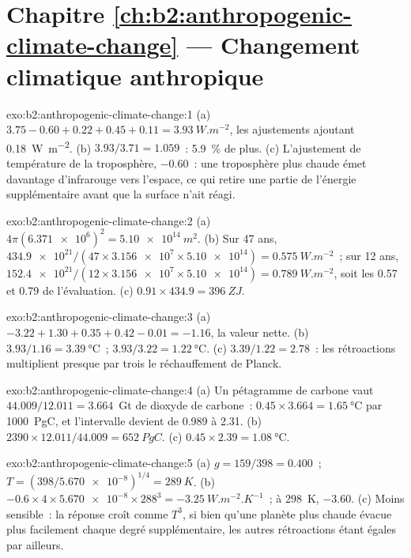\section*{Chapitre \ref{ch:b2:anthropogenic-climate-change} --- Changement climatique anthropique}

\begin{solution}{exo:b2:anthropogenic-climate-change:1}
(a) $3.75 - 0.60 + 0.22 + 0.45 + 0.11 = \qty{3.93}{W.m^{-2}}$, les ajustements ajoutant
\qty{0.18}{W.m^{-2}}. (b) $3.93/3.71 = 1.059$~: \qty{5.9}{\percent} de plus. (c) L'ajustement de
température de la troposphère, $-0.60$~: une troposphère plus chaude émet davantage d'infrarouge vers
l'espace, ce qui retire une partie de l'énergie supplémentaire avant que la surface n'ait réagi.
\end{solution}

\begin{solution}{exo:b2:anthropogenic-climate-change:2}
(a) $4\pi(\num{6.371e6})^2 = \qty{5.10e14}{m^2}$. (b) Sur 47 ans, $\num{434.9e21}/(47 \times
\num{3.156e7} \times \num{5.10e14}) = \qty{0.575}{W.m^{-2}}$~; sur 12 ans, $\num{152.4e21}/(12
\times \num{3.156e7} \times \num{5.10e14}) = \qty{0.789}{W.m^{-2}}$, soit les 0.57 et 0.79 de
l'évaluation. (c) $0.91 \times 434.9 = \qty{396}{ZJ}$.
\end{solution}

\begin{solution}{exo:b2:anthropogenic-climate-change:3}
(a) $-3.22 + 1.30 + 0.35 + 0.42 - 0.01 = \num{-1.16}$, la valeur nette. (b) $3.93/1.16 =
\qty{3.39}{\celsius}$~; $3.93/3.22 = \qty{1.22}{\celsius}$. (c) $3.39/1.22 = 2.78$~: les
rétroactions multiplient presque par trois le réchauffement de Planck.
\end{solution}

\begin{solution}{exo:b2:anthropogenic-climate-change:4}
(a) Un pétagramme de carbone vaut $44.009/12.011 = 3.664$~Gt de dioxyde de carbone~: $0.45 \times 3.664 =
\qty{1.65}{\celsius}$ par \qty{1000}{PgC}, et l'intervalle devient de 0.989 à 2.31. (b) $2390 \times
12.011/44.009 = \qty{652}{PgC}$. (c) $0.45 \times 2.39 = \qty{1.08}{\celsius}$.
\end{solution}

\begin{solution}{exo:b2:anthropogenic-climate-change:5}
(a) $g = 159/398 = 0.400$~; $T = (398/\num{5.670e-8})^{1/4} = \qty{289}{K}$. (b) $-0.6 \times 4
\times \num{5.670e-8} \times 288^3 = \qty{-3.25}{W.m^{-2}.K^{-1}}$~; à \qty{298}{K}, $-3.60$.
(c) Moins sensible~: la réponse croît comme $T^3$, si bien qu'une planète plus chaude évacue
plus facilement chaque degré supplémentaire, les autres rétroactions étant égales par ailleurs.
\end{solution}

